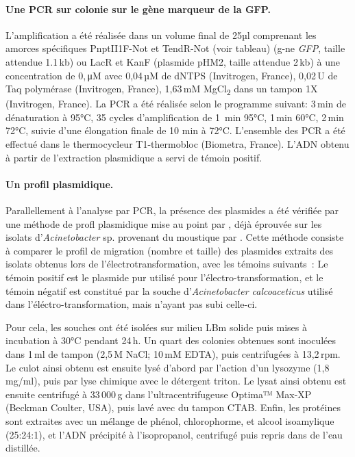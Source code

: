 \paragraph{Une PCR sur colonie sur le gène marqueur de la GFP.}
L'amplification a été réalisée dans un volume final de 25µl comprenant les amorces spécifiques PnptII1F-Not et TendR-Not (voir tableau)
(g-ne \textit{GFP}, taille attendue 1.1\,kb) ou LacR et KanF (plasmide pHM2, taille attendue 2\,kb) à une concentration de 0,\,μM avec 0,04\,µM de dNTPS (Invitrogen, France), 0,02\,U de Taq polymérase (Invitrogen, France), 1,63\,mM MgCl\textsubscript{2} dans un tampon 1X (Invitrogen, France).
La PCR a été réalisée selon le programme suivant: 3\,min de dénaturation à 95°C, 35 cycles d'amplification de 1\ min 95°C, 1\,min 60°C, 2\,min 72°C, suivie d'une élongation finale de 10 min à 72°C.
L'ensemble des PCR a été effectué dans le thermocycleur T1-thermobloc (Biometra, France).
L'ADN obtenu à partir de l'extraction plasmidique a servi de témoin positif.

\paragraph{Un profil plasmidique.}
Parallellement à l'analyse par PCR, la présence des plasmides a été vérifiée par une méthode de profl plasmidique mise au point par \textcite{seifert1994}, déjà éprouvée sur les isolats d'\textit{Acinetobacter} sp. provenant du moustique par \textcite{minard2013}.
Cette méthode consiste à comparer le profil de migration (nombre et taille) des plasmides extraits des isolats obtenus lors de l'électrotransformation, avec les témoins suivants~: Le témoin positif est le plasmide pur utilisé pour l'électro-transformation, et le témoin négatif est constitué par la souche d'\textit{Acinetobacter calcoaceticus} utilisé dans l'éléctro-transformation, mais n'ayant pas subi celle-ci.

Pour cela, les souches ont été isolées sur milieu LBm solide puis mises à incubation à 30°C pendant 24\,h.
Un quart des colonies obtenues sont inoculées dans 1\,ml de tampon (2,5\,M NaCl; 10\,mM EDTA), puis centrifugées à 13,2\,rpm.
Le culot ainsi obtenu est ensuite lysé d'abord par l'action d'un lysozyme (1,8\,mg/ml), puis par lyse chimique avec le détergent triton.
Le lysat ainsi obtenu est ensuite centrifugé à 33\,000\,g dans l'ultracentrifugeuse Optima™ Max-XP (Beckman Coulter, USA), puis lavé avec du tampon CTAB.
Enfin, les protéines sont extraites avec un mélange de phénol, chlorophorme, et alcool isoamylique (25:24:1), et l'ADN précipité à l'isopropanol, centrifugé puis repris dans de l'eau distillée.


